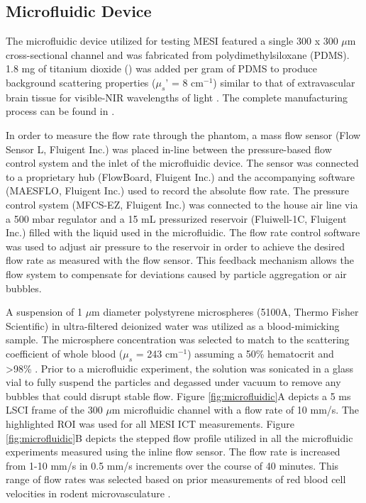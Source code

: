 \subsection{Microfluidic Device}

The microfluidic device utilized for testing MESI featured a single 300 x 300 $\mu$m cross-sectional channel and was fabricated from polydimethylsiloxane (PDMS). 1.8 mg of titanium dioxide () was added per gram of PDMS to produce background scattering properties ($\mu_s$' = 8 cm$^{-1}$)\cite{Parthasarathy:2008el} similar to that of extravascular brain tissue for visible-NIR wavelengths of light \cite{Yaroslavsky:2002tg}. The complete manufacturing process can be found in \cite{Richards:2016hy}.

In order to measure the flow rate through the phantom, a mass flow sensor (Flow Sensor L, Fluigent Inc.) was placed in-line between the pressure-based flow control system and the inlet of the microfluidic device. The sensor was connected to a proprietary hub (FlowBoard, Fluigent Inc.) and the accompanying software (MAESFLO, Fluigent Inc.) used to record the absolute flow rate. The pressure control system (MFCS-EZ, Fluigent Inc.) was connected to the house air line via a 500 mbar regulator and a 15 mL pressurized reservoir (Fluiwell-1C, Fluigent Inc.) filled with the liquid used in the microfluidic. The flow rate control software was used to adjust air pressure to the reservoir in order to achieve the desired flow rate as measured with the flow sensor. This feedback mechanism allows the flow system to compensate for deviations caused by particle aggregation or air bubbles.

A suspension of 1 $\mu$m diameter polystyrene microspheres (5100A, Thermo Fisher Scientific) in ultra-filtered deionized water was utilized as a blood-mimicking sample. The microsphere concentration was selected to match to the scattering coefficient of whole blood ($\mu_s$ = 243 cm$^{-1}$) assuming a 50\% hematocrit and  \textgreater 98\% \cite{Yaroslavsky:2002tg}. Prior to a microfluidic experiment, the solution was sonicated in a glass vial to fully suspend the particles and degassed under vacuum to remove any bubbles that could disrupt stable flow. Figure \ref{fig:microfluidic}A depicts a 5 ms LSCI frame of the 300 $\mu$m microfluidic channel with a flow rate of 10 mm/s. The highlighted ROI was used for all MESI ICT measurements. Figure \ref{fig:microfluidic}B depicts the stepped flow profile utilized in all the microfluidic experiments measured using the inline flow sensor. The flow rate is increased from 1-10 mm/s in 0.5 mm/s increments over the course of 40 minutes. This range of flow rates was selected based on prior measurements of red blood cell velocities in rodent microvasculature \cite{Tomita:2008do}.


